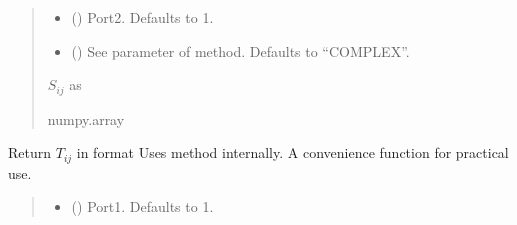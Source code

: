 \documentclass[letterpaper,10pt,english]{sphinxmanual}
\begin{document}
\begin{fulllineitems}
\begin{fulllineitems}
\begin{quote}
\begin{description}
\begin{itemize}
\item {} 
\sphinxAtStartPar
{} (\sphinxstyleliteralemphasis{\sphinxupquote{, }}) \textendash{} Port\sphinxhyphen{}2. Defaults to 1.

\item {} 
\sphinxAtStartPar
{} (\sphinxstyleliteralemphasis{\sphinxupquote{, }}) \textendash{} See  parameter of  method. Defaults to “COMPLEX”.

\end{itemize}

\sphinxAtStartPar
\(S_{i j}\) as 

\sphinxAtStartPar
numpy.array

\end{description}\end{quote}

\end{fulllineitems}


\begin{fulllineitems}
\label{\detokenize{touchstone:touchstone.spfile.T}}
\pysigstartsignatures
{}
\pysigstopsignatures
\sphinxAtStartPar
Return \(T_{i j}\) in format 
Uses  method internally. A convenience function for practical use.
\begin{quote}\begin{description}
\begin{itemize}
\item {} 
\sphinxAtStartPar
{} (\sphinxstyleliteralemphasis{\sphinxupquote{, }}) \textendash{} Port\sphinxhyphen{}1. Defaults to 1.


\end{itemize}
\end{description}
\end{quote}
\end{fulllineitems}
\end{fulllineitems}
\end{document}
